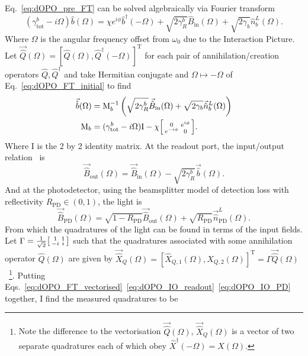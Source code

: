 Eq.~\ref{eq:dOPO_pre_FT} can be solved algebraically via Fourier transform %
\begin{equation}
\label{eq:dOPO_FT_initial}
(\gamma^b_\mathrm{tot}-i \Omega)\hat b(\Omega)=\chi e^{i\phi}\hat b^\dag(-\Omega)  + \sqrt{2\gamma^b_R}\hat{B}_\mathrm{in}(\Omega) + \sqrt{2\gamma_b}\hat{n}^L_b(\Omega).
\end{equation}
Where $\Omega$ is the angular frequency offset from $\omega_0$ due to the Interaction Picture. %
Let $\vec{\hat{Q}}(\Omega)=[\hat{Q}(\Omega),\hat{Q}^\dag(-\Omega)]^\text{T}$ for each pair of annihilation/creation operators $\hat Q, \hat Q^\dag$ and take Hermitian conjugate and $\Omega\mapsto -\Omega$ of Eq.~\ref{eq:dOPO_FT_initial} to find
\begin{align}
\label{eq:dOPO_FT_vectorised}
\vec{\hat b}(\Omega)&=\text{M}_b^{-1}\left(\sqrt{2\gamma^b_R}\vec{\hat{B}}_\mathrm{in}(\Omega) + \sqrt{2\gamma_b}\vec{\hat{n}}^L_b(\Omega)\right)\\
\text{M}_b&=(\gamma^b_\mathrm{tot}-i \Omega)\text{I}-\chi \begin{bsmallmatrix}0 & e^{i\phi} \\e^{-i\phi} & 0\end{bsmallmatrix}.
\end{align}
Where $\text{I}$  is the 2 by 2 identity matrix. At the readout port, the input/output relation~\cite{} is 
\begin{equation}
\label{eq:dOPO_IO_readout}\vec{\hat{B}}_\mathrm{out}(\Omega)=\vec{\hat{B}}_\mathrm{in}(\Omega)-\sqrt{2\gamma^b_R}\vec{\hat b}(\Omega).
\end{equation} 
And at the photodetector, using the beamsplitter model of detection loss with reflectivity $R_\text{PD}\in(0,1)$, the light is 
\begin{equation}
\label{eq:dOPO_IO_PD}\vec{\hat{B}}_\mathrm{PD}(\Omega)=\sqrt{1-R_\text{PD}}\vec{\hat{B}}_\mathrm{out}(\Omega)+\sqrt{R_\text{PD}}\vec{\hat n}^L_\text{PD}(\Omega).
\end{equation} 
From which the quadratures of the light can be found in terms of the input fields. Let $\Gamma = \frac{1}{\sqrt2} \begin{bsmallmatrix}1 & 1 \\-i & i\end{bsmallmatrix}$ such that the quadratures associated with some annihilation operator $\hat{Q}(\Omega)$ are given by $\vec{\hat{X}}_Q(\Omega)=[\hat{X}_{Q,1}(\Omega),\hat{X}_{Q,2}(\Omega)]^\text{T}=\Gamma \vec{\hat{Q}}(\Omega)$~\footnote{Note the difference to the vectorisation $\vec{\hat{Q}}(\Omega)$, $\vec{\hat{X}}_Q(\Omega)$ is a vector of two separate quadratures each of which obey $\hat{X}^\dag(-\Omega)=\hat{X}(\Omega)$.}. Putting Eqs.~\ref{eq:dOPO_FT_vectorised}~\ref{eq:dOPO_IO_readout}~\ref{eq:dOPO_IO_PD} together, I find the measured quadratures to be
